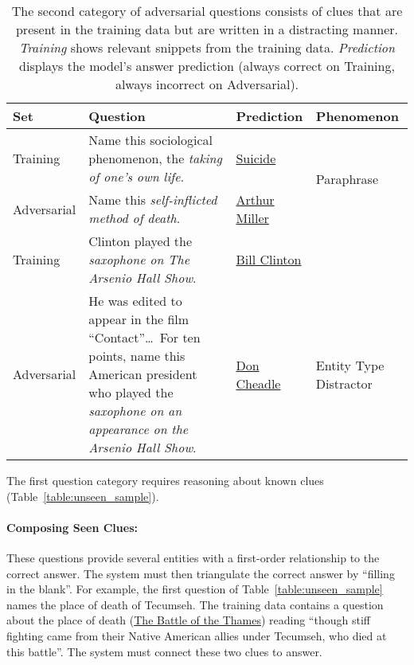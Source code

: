 \begin{table*}[t]
\centering
\begin{tabular}{p{1.75cm}p{8.5cm}lp{2cm}}
\hline
         Set & Question    & Prediction      & Phenomenon                  \\ \hline

Training & Name this sociological phenomenon, the \emph{taking of one's own life}. & \underline{Suicide} & \multirow{2}{*}{Paraphrase} \\
Adversarial  & Name this \emph{self-inflicted method of death}. & \underline{Arthur Miller} & \\ \hline

Training &  Clinton played the \emph{saxophone on The Arsenio Hall Show}.  & \underline{Bill Clinton} &  \\ 
Adversarial & He was edited to appear in the film ``Contact''\dots\ For ten points, name this American president who played the \emph{saxophone on an appearance on the Arsenio Hall Show}. & \underline{Don Cheadle} & Entity Type Distractor \\ \hline

\end{tabular}
\caption{The second category of adversarial questions consists of clues that are present in the training data but are written in a distracting manner. \emph{Training} shows relevant snippets from the training data. \emph{Prediction} displays the  model's answer prediction (always correct on Training, always incorrect on Adversarial).}
\label{table:rewrite_sample}
\end{table*}

The first question category requires reasoning about known clues (Table~\ref{table:unseen_sample}).~\smallskip

\paragraph{Composing Seen Clues:} These questions provide several entities with a first-order
relationship to the correct answer. The system must then
triangulate the correct answer by ``filling in the blank''. For
example, the first question of Table~\ref{table:unseen_sample} names the
place of death of Tecumseh. The training data contains a
question about the place of death (\underline{The Battle of the Thames}) reading
``though stiff fighting came from their Native American allies under
Tecumseh, who died at this battle''. The system must connect these two
clues to answer.~\smallskip


